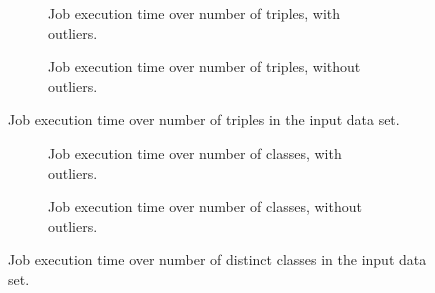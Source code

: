 \begin{figure}[ht]
  \begin{subfigure}{\textwidth}
    \centering
    
    \caption{Job execution time over number of  \glspl{triple}, with outliers.}
    \label{fig:jobs-over-P31s-with-outliers}
  \end{subfigure}
  \begin{subfigure}{\textwidth}
    \centering
    
    \caption{Job execution time over number of  \glspl{triple}, without outliers.}
    \label{fig:jobs-over-P31s-without-outliers}
  \end{subfigure}
  \caption{Job execution time over number of  \glspl{triple} in the input data set.}
  \label{fig:jobs-over-P31s}
\end{figure}

\begin{figure}[ht]
  \begin{subfigure}{\textwidth}
    \centering
    
    \caption{Job execution time over number of classes, with outliers.}
    \label{fig:jobs-over-classes-with-outliers}
  \end{subfigure}
  \begin{subfigure}{\textwidth}
    \centering
    
    \caption{Job execution time over number of classes, without outliers.}
    \label{fig:jobs-over-classes-without-outliers}
  \end{subfigure}
  \caption{Job execution time over number of distinct classes in the input data set.}
  \label{fig:jobs-over-classes}
\end{figure}
